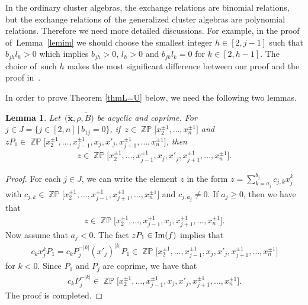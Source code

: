 \documentclass[10pt,a4paper]{amsart}
\numberwithin{equation}{section}
\newtheorem{Lemma}[Theorem]{Lemma}
\begin{document}
\begin{Remark}In the ordinary cluster algebras, the exchange relations are binomial relations, but the exchange relations of~the generalized cluster algebras are polynomial relations. Therefore we need more detailed discussions. For example, in the proof of~Lemma~\ref{lemim} we should choose the smallest integer $h\in[2,j-1]$ such that $b_{jh}l_h>0$ which implies $b_{jh}>0$, $l_h>0$ and $b_{jk}l_k=0$ for $k\in[2,h-1]$. The choice of~such $h$ makes the most significant difference between our proof and the proof in~\cite{bfz}.
\end{Remark}

In order to prove Theorem \ref{thmL=U} below, we need the following two lemmas.
\begin{Lemma}\label{lemzp}
Let~$\big(\widetilde{\mathbf{x}},\rho,\widetilde{B}\big)$ be acyclic and coprime.
For $j\in J=\{j\in[2,n]\,|\, b_{1j}=0\}$, if~$z\in \mathop{\mathbb{ZP}}\!\big[x^{\pm1}_2,\ldots,x^{\pm1}_n\big]$ and $zP_1\in\mathop{\mathbb{ZP}}\!\big[x^{\pm1}_{2},\ldots,x^{\pm1}_{j-1},x_j,x'_j,
x^{\pm1}_{j+1},\ldots,x^{\pm1}_{n}\big]$,
then
\begin{gather*}
z\in\mathop{\mathbb{ZP}}
\big[x^{\pm1}_{2},\ldots,x^{\pm1}_{j-1},x_j,x'_j,x^{\pm1}_{j+1},\ldots,x^{\pm1}_{n}\big].
\end{gather*}
\end{Lemma}
\begin{proof}
For each $j\in J$, we can write the element $z$ in the form $z=\sum\limits_{k=a_j}^{b_j}c_{j,k}x^{k}_j$ with $c_{j,k}\in \mathop{\mathbb{ZP}}\!\big[x^{\pm1}_{2},\ldots,x^{\pm1}_{j-1},x^{\pm1}_{j+1},\ldots,x^{\pm1}_{n}\big]$ and $c_{j,a_j}\neq0$.
If $a_j\geq0$, then we have that
\begin{gather*}
z\in \mathop{\mathbb{ZP}}\!\big[x^{\pm1}_{2},\ldots, x^{\pm1}_{j-1},x_j,x^{\pm1}_{j+1},\ldots,x^{\pm1}_{n}\big].
\end{gather*}
Now assume that $a_j<0$. The fact $zP_1\in\mathop{\rm Im}(f)$ implies that
\begin{gather*}
c_kx_{j}^{k}P_1= c_kP^{-|k|}_j(x'_j)^{|k|}P_1\in \mathop{\mathbb{ZP}}\!\big[x^{\pm1}_{2},\ldots,x^{\pm1}_{j-1},x_j,x'_j,x^{\pm1}_{j+1},\ldots,x^{\pm1}_{n}\big]
\end{gather*}
for $k<0$. Since $P_1$ and $P_j$ are coprime, we have that
\begin{gather*}
c_kP^{-|k|}_j\in \mathop{\mathbb{ZP}}\!\big[x^{\pm1}_{2},\ldots,x^{\pm1}_{j-1},x_j,x'_j,x^{\pm1}_{j+1},\ldots,x^{\pm1}_{n}\big].
\end{gather*}
The proof is completed.
\end{proof}
\end{document}

